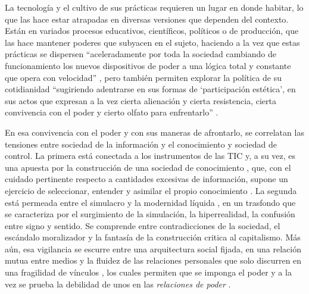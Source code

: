 \documentclass{textolivre}
\begin{document}
La tecnología y el cultivo de sus prácticas requieren un lugar en donde habitar, lo que las hace estar atrapadas en diversas versiones que dependen del contexto. Están en variados procesos educativos, científicos, políticos o de producción, que las hace mantener poderes que subyacen en el sujeto, haciendo a la vez que estas prácticas se dispersen  “aceleradamente por toda la sociedad cambiando de funcionamiento los nuevos dispositivos de poder a una lógica total y constante que opera con velocidad” \cite[p. 18]{sibilia_hombre_2007}, pero también permiten explorar la política de su cotidianidad “sugiriendo adentrarse en sus formas de ‘participación estética’, en sus actos que expresan a la vez cierta alienación y cierta resistencia, cierta convivencia con el poder y cierto olfato para enfrentarlo” \cite[p. 7]{munoz_comunicacion_2007}.

En esa convivencia con el poder y con sus maneras de afrontarlo, se correlatan las tensiones entre sociedad de la información y el conocimiento y sociedad de control. La primera está conectada a los instrumentos de las TIC y, a su vez, es una apuesta por la construcción de una sociedad de conocimiento \cite{diaz_bernal_alisis_2012}, que, con el cuidado pertinente respecto a cantidades excesivas de información, supone un ejercicio de seleccionar, entender y asimilar el propio conocimiento \cite{barcelo_sociedad_1998}. La segunda está permeada entre el simulacro \cite{baudrillard_cultura_2013} y la modernidad líquida \cite{bauman_vigilancia_2013}, en un trasfondo que se caracteriza por el surgimiento de la simulación, la hiperrealidad, la confusión entre signo y sentido. Se comprende entre contradicciones de la sociedad, el escándalo moralizador y la fantasía de la construcción critica al capitalismo. Más aún, esa vigilancia se escurre entre una arquitectura social fijada, en una relación mutua entre medios y la fluidez de las relaciones personales que solo discurren en una fragilidad de vínculos \cite{bauman_vigilancia_2013}, los cuales permiten que se imponga el poder y a la vez se prueba la debilidad de unos en las \textit{relaciones de poder} \cite{foucault_redes_1982, garcia_universidad_2019}.
\end{document}
